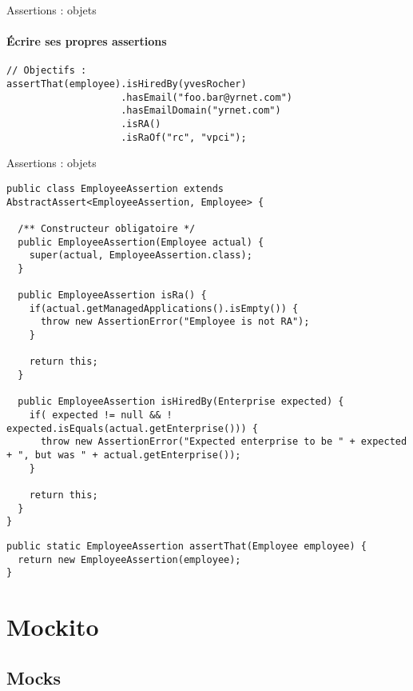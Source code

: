 \documentclass[compress]{beamer}%
\begin{document}
\begin{frame}[fragile]{Assertions : objets}
	\framesubtitle{Écrire ses propres assertions}
	
	\begin{lstlisting}
// Objectifs :
assertThat(employee).isHiredBy(yvesRocher)
                    .hasEmail("foo.bar@yrnet.com")
                    .hasEmailDomain("yrnet.com")
                    .isRA()
                    .isRaOf("rc", "vpci");
	\end{lstlisting}
	
\end{frame}

\begin{frame}[fragile]{Assertions : objets}
	\begin{lstlisting}
public class EmployeeAssertion extends AbstractAssert<EmployeeAssertion, Employee> {
  
  /** Constructeur obligatoire */
  public EmployeeAssertion(Employee actual) {
    super(actual, EmployeeAssertion.class);
  }
  
  public EmployeeAssertion isRa() {
    if(actual.getManagedApplications().isEmpty()) {
      throw new AssertionError("Employee is not RA");
    }
    
    return this;
  }
  
  public EmployeeAssertion isHiredBy(Enterprise expected) {
    if( expected != null && ! expected.isEquals(actual.getEnterprise())) {
      throw new AssertionError("Expected enterprise to be " + expected + ", but was " + actual.getEnterprise());
    }
    
    return this;
  }
}
	\end{lstlisting}
	
	\pause
	\begin{lstlisting}
public static EmployeeAssertion assertThat(Employee employee) {
  return new EmployeeAssertion(employee);
}
	\end{lstlisting}
\end{frame}


\section{Mockito}

\subsection{Mocks}
\end{document}
